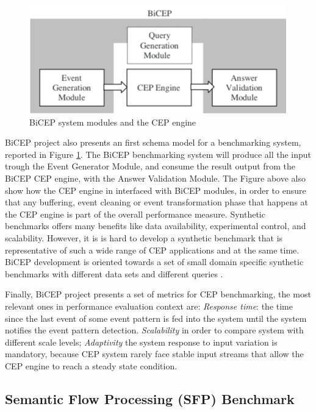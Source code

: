 \begin{figure}[tbh]
  \centering
	\includegraphics[width=\linewidth]{images/bicep_schema}
	\caption{BiCEP system  modules and the CEP engine} 
  	\label{fig:bicep-schema}
\end{figure}

BiCEP project also presents an first schema model for a benchmarking system, reported in Figure \ref{fig:bicep-schema}. The BiCEP benchmarking system will produce all the input trough the Event Generator Module, and consume the result output from the BiCEP CEP engine, with the Answer Validation Module. The Figure above also show how the CEP engine in interfaced with BiCEP modules, in order to ensure that any buffering, event cleaning or event transformation phase that happens at the CEP engine is part of the overall performance measure. Synthetic benchmarks offers many benefits like data availability, experimental control, and scalability. However, it is is hard to develop a synthetic benchmark that is representative of such a wide range of CEP applications and at the same time. BiCEP development is oriented towards a set of small domain specific synthetic benchmarks with different data sets and different queries \cite{bizarro:DSP:2007:1143}.

Finally, BiCEP project presents a set of metrics for CEP benchmarking, the most relevant ones in performance evaluation context are: \textit{Response time}: the time since the last event of some event pattern is fed into the system until the system notifies the event pattern detection. \textit{Scalability} in order to compare system with different scale levels; \textit{Adaptivity} the system response to input variation is mandatory, because CEP system rarely face stable input streams that allow the CEP engine to reach a steady state condition.

\subsection{Semantic Flow Processing (SFP) Benchmark}\label{sec:sr-benchmarking}

